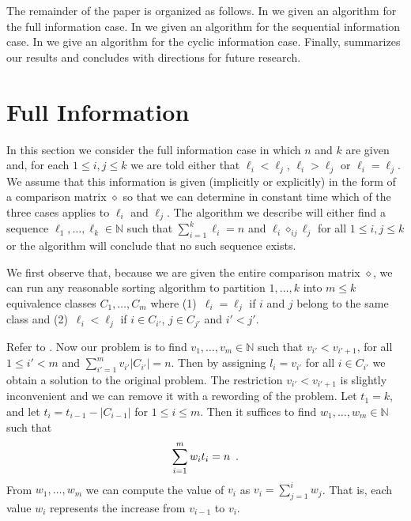\documentclass[11pt]{patmorin}
\newcommand{\N}{\mathbb{N}}
\newcommand{\op}{\diamond}
\newcommand{\opij}{\op_{ij}}
\begin{document}
The remainder of the paper is organized as follows.  In
 we given an algorithm for the full
information case.  In  we given an
algorithm for the sequential information case.  In
 we give an algorithm for the cyclic
information case. Finally,  summarizes our results
and concludes with directions for future research.

\section{Full Information}

In this section we consider the full information case in which $n$ and
$k$ are given and, for each $1\le i,j \le k$ we are told either that
$\ell_i< \ell_j$, $\ell_i > \ell_j$ or $\ell_i = \ell_j$.  We assume
that this information is given (implicitly or explicitly) in the form
of a comparison matrix $\op$ so that we can determine in constant time
which of the three cases applies to $\ell_i$ and $\ell_j$.  The
algorithm we describe will either find a sequence
$\ell_1,\ldots,\ell_k\in\N$ such that $\sum_{i=1}^k\ell_i = n$ and
$\ell_i\opij\ell_j$ for all $1\le i,j\le k$ or the algorithm will
conclude that no such sequence exists.

We first observe that, because we are given the entire comparison
matrix $\op$, we can run any reasonable sorting algorithm to partition
$1,\ldots,k$ into  $m\le k$ equivalence classes $C_1,\ldots,C_{m}$
where (1)~$\ell_i = \ell_j$ if $i$ and $j$ belong to the same class and
(2)~$\ell_i < \ell_j$ if $i\in C_{i'}$, $j\in C_{j'}$ and $i'< j'$.

Refer to .  Now our problem is to find
$v_1,\ldots,v_{m}\in\N$ such that $v_{i'} < v_{i'+1}$, for all $1\le
i' <
m$ and $\sum_{i'=1}^m{v_{i'}|C_{i'}|} = n$.  Then by assigning $l_i=v_{i'}$
for all $i\in C_{i'}$ we obtain a solution to the original problem.
The restriction $v_{i'} < v_{i'+1}$ is slightly inconvenient and we
can remove it with a rewording of the problem.  Let $t_1 = k$,
 and let $t_i=t_{i-1}-|C_{i-1}|$ for $1\le i\le m$.  Then
it suffices to find $w_1,\ldots,w_m\in\N$ such that
\begin{equation}
       \sum_{i=1}^m w_it_i = n \enspace . \eqlabel{wis}
\end{equation}
From $w_1,\ldots, w_m$ we can compute the value of $v_i$ as 
$v_i=\sum_{j=1}^i w_j$.  That is, each value $w_i$
represents the increase from $v_{i-1}$ to $v_i$.
\end{document}

